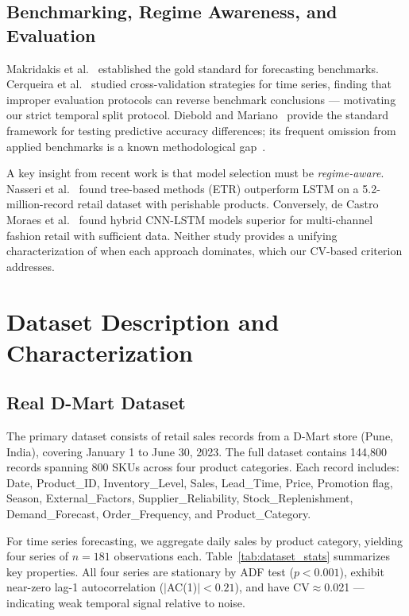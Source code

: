 \documentclass[journal]{IEEEtran}
\begin{document}
\subsection{Benchmarking, Regime Awareness, and Evaluation}

Makridakis et al.~\cite{makridakis2018m4,makridakis2022m5} established the gold standard for forecasting benchmarks. Cerqueira et al.~\cite{cerqueira2020evaluating} studied cross-validation strategies for time series, finding that improper evaluation protocols can reverse benchmark conclusions — motivating our strict temporal split protocol. Diebold and Mariano~\cite{diebold1995comparing} provide the standard framework for testing predictive accuracy differences; its frequent omission from applied benchmarks is a known methodological gap~\cite{hyndman2018forecasting}.

A key insight from recent work is that model selection must be \emph{regime-aware}. Nasseri et al.~\cite{nasseri2023tree} found tree-based methods (ETR) outperform LSTM on a 5.2-million-record retail dataset with perishable products. Conversely, de Castro Moraes et al.~\cite{moraes2024hybrid} found hybrid CNN-LSTM models superior for multi-channel fashion retail with sufficient data. Neither study provides a unifying characterization of when each approach dominates, which our CV-based criterion addresses.

\section{Dataset Description and Characterization}
\label{sec:data}

\subsection{Real D-Mart Dataset}

The primary dataset consists of retail sales records from a D-Mart store (Pune, India), covering January 1 to June 30, 2023. The full dataset contains 144,800 records spanning 800 SKUs across four product categories. Each record includes: Date, Product\_ID, Inventory\_Level, Sales, Lead\_Time, Price, Promotion flag, Season, External\_Factors, Supplier\_Reliability, Stock\_Replenishment, Demand\_Forecast, Order\_Frequency, and Product\_Category.

For time series forecasting, we aggregate daily sales by product category, yielding four series of $n{=}181$ observations each. Table~\ref{tab:dataset_stats} summarizes key properties. All four series are stationary by ADF test ($p<0.001$), exhibit near-zero lag-1 autocorrelation ($|$AC(1)$|<0.21$), and have CV$\approx$0.021 — indicating weak temporal signal relative to noise.
\end{document}
